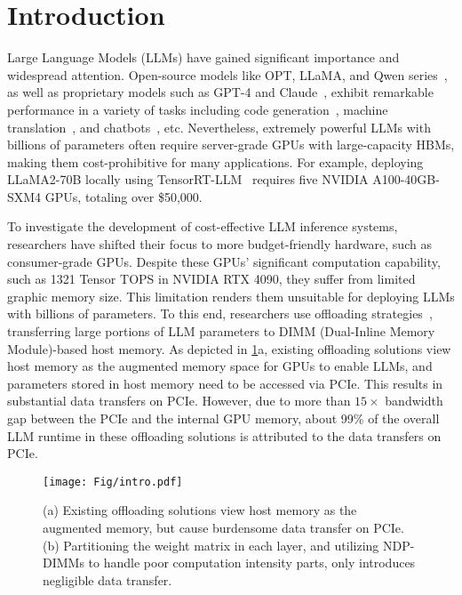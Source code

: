 
\section{Introduction}

Large Language Models (LLMs) have gained significant importance and widespread attention. Open-source models like OPT, LLaMA, and Qwen series~\cite{zhang2022opt, qwen2, touvron2023llama2}, as well as proprietary models such as GPT-4 and Claude~\cite{achiam2023gpt, claude3}, exhibit remarkable performance in a variety of tasks including code generation~\cite{chen2021evaluating, Copilot}, machine translation~\cite{le2023bloom, jiang2023mistral}, and chatbots~\cite{chatgpt2023, bard2023}, etc. Nevertheless, extremely powerful LLMs with billions of parameters often require server-grade GPUs with large-capacity HBMs, making them cost-prohibitive for many applications. For example, deploying LLaMA2-70B locally using TensorRT-LLM~\cite{tensorrt-llm} requires five NVIDIA A100-40GB-SXM4 GPUs, totaling over \$50,000.

To investigate the development of cost-effective LLM inference systems, researchers have shifted their focus to more budget-friendly hardware, such as consumer-grade GPUs. Despite these GPUs' significant computation capability, such as 1321 Tensor TOPS in NVIDIA RTX 4090, they suffer from limited graphic memory size. This limitation renders them unsuitable for deploying LLMs with billions of parameters. To this end, researchers use offloading strategies~\cite{jain2022hugging, rasley2020deepspeed, sheng2023flexgen}, transferring large portions of LLM parameters to DIMM (Dual-Inline Memory Module)-based host memory. As depicted in \fig \ref{fig:offloading}a, existing offloading solutions view host memory as the augmented memory space for GPUs to enable LLMs, and parameters stored in host memory need to be accessed via PCIe. This results in substantial data transfers on PCIe. However, due to more than $15 \times$ bandwidth gap between the PCIe and the internal GPU memory, about 99\% of the overall LLM runtime in these offloading solutions is attributed to the data transfers on PCIe. 

\begin{figure}
    \centering
    \texttt{[image: Fig/intro.pdf]}
    \vspace{-0.3cm}
    \caption{(a) Existing offloading solutions view host memory as the augmented memory, but cause burdensome data transfer on PCIe. (b) Partitioning the weight matrix in each layer, and utilizing NDP-DIMMs to handle poor computation intensity parts, only introduces negligible data transfer.}
    \label{fig:offloading}
\vspace{-0.3cm}
\end{figure}

